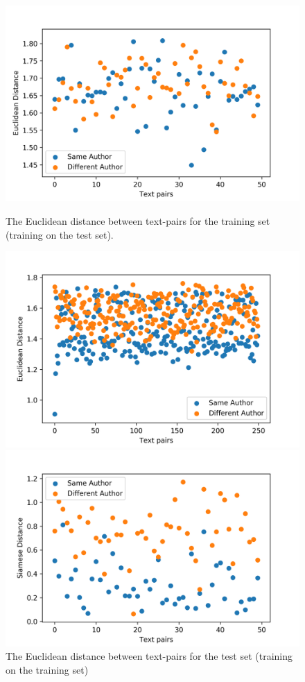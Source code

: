 \begin{figure}[!htb]
  \centering
  \begin{minipage}[b]{0.49\textwidth}
    \includegraphics[width=\textwidth]{train_euc}
    \caption{The Euclidean distance between text-pairs for the training set (training on the test set).\label{fig:euc_train}}
  \end{minipage}
  \hfill
  \begin{minipage}[b]{0.49\textwidth}
    \includegraphics[width=\textwidth]{test_euc}
    \caption{The Euclidean distance between text-pairs for the test set (training on the training set)} \label{fig:euc_test}
  \end{minipage}
  \begin{minipage}[b]{0.49\textwidth}
    \includegraphics[width=\textwidth]{train_siam}

\end{minipage}
\end{figure}
